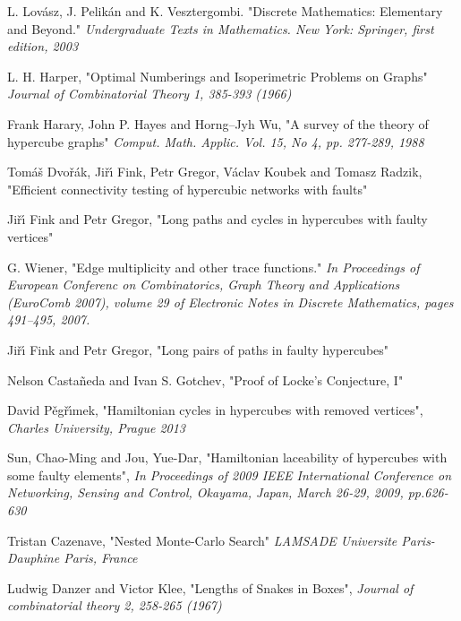 \documentclass{pracamgr}
\begin{document}
\begin{thebibliography}{99}

   L. Lov\'{a}sz, J. Pelik\'{a}n and K. Vesztergombi.
   "Discrete Mathematics: Elementary and Beyond."
   \textit{Undergraduate Texts in Mathematics. New York: Springer, first edition, 2003}   

   L. H. Harper,
   "Optimal Numberings and Isoperimetric Problems on Graphs"
   \textit{Journal of Combinatorial Theory 1, 385-393 (1966)}
   
   Frank Harary, John P. Hayes and Horng--Jyh Wu,
   "A survey of the theory of hypercube graphs"
   \textit{Comput. Math. Applic. Vol. 15, No 4, pp. 277-289, 1988}
   
   Tom\'{a}\v{s} Dvo\v{r}\'{a}k, Ji\v{r}\'{\i} Fink, Petr Gregor, V\'{a}clav Koubek and Tomasz Radzik,
   "Efficient connectivity testing of hypercubic networks with faults"
   
   Ji\v{r}\'{\i} Fink and Petr Gregor,
   "Long paths and cycles in hypercubes with faulty vertices"
   
   G. Wiener,
   "Edge multiplicity and other trace functions."
   \textit{In Proceedings of European Conferenc on Combinatorics, Graph Theory and Applications (EuroComb 2007), volume 29 of
   Electronic Notes in Discrete Mathematics, pages 491–495, 2007.}
   
   Ji\v{r}\'{\i} Fink and Petr Gregor,
   "Long pairs of paths in faulty hypercubes"
  
   Nelson Casta\~{n}eda and Ivan S. Gotchev,
   "Proof of Locke's Conjecture, I"

   David P\v{e}g\v{r}\'{\i}mek,
   "Hamiltonian cycles in hypercubes with removed vertices",
   \textit{Charles University, Prague 2013}
  
   Sun, Chao-Ming and Jou, Yue-Dar,
   "Hamiltonian laceability of hypercubes with some faulty elements",
   \textit{In Proceedings of 2009 IEEE International Conference on Networking, Sensing and Control, Okayama, Japan,
   March 26-29, 2009, pp.626-630}
  
   Tristan Cazenave,
   "Nested Monte-Carlo Search"
   \textit{LAMSADE Universite Paris-Dauphine Paris, France}  
  
   Ludwig Danzer and Victor Klee,
   "Lengths of Snakes in Boxes",
   \textit{Journal of combinatorial theory 2, 258-265 (1967)}


\end{thebibliography}
\end{document}
